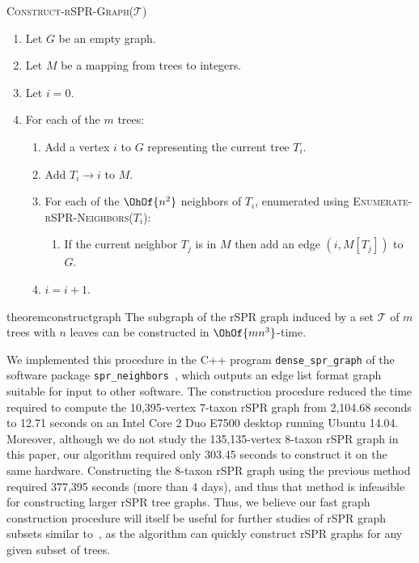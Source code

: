 \documentclass[11pt,onecolumn,conference]{IEEEtran}
\newtheorem{theorem}{Theorem}[section]
\begin{document}
\textsc{Construct-rSPR-Graph($\mathcal{T}$)}
\begin{enumerate}[label={\arabic*}.]
	\item Let $G$ be an empty graph.
	\item Let $M$ be a mapping from trees to integers.
	\item Let $i = 0$.
	\item For each of the $m$ trees: \vspace{-0.2em}
		\begin{enumerate}
			\item Add a vertex $i$ to $G$ representing the current tree $T_i$.
			\item Add $T_i \rightarrow i$ to $M$.
			\item For each of the $\OhOf{n^2}$ neighbors of $T_i$, enumerated using \textsc{Enumerate-rSPR-Neighbors($T_i$)}: \vspace{-1.4em}
				\begin{enumerate}
					\item If the current neighbor $T_j$ is in $M$ then add an edge $(i,M[T_j])$ to $G$.
				\end{enumerate}
		\item $i = i + 1$.
		\end{enumerate}
\end{enumerate}

\begin{restatable}{theorem}{constructgraph}
	\label{thm:construct_graph}
	The subgraph of the rSPR graph induced by a set $\mathcal{T}$ of $m$ trees with $n$ leaves can be constructed in $\OhOf{mn^3}$-time.
\end{restatable}

We implemented this procedure in the C++ program \texttt{dense\_spr\_graph} of the software package \texttt{spr\_neighbors}~\cite{spr_neighbors}, which outputs an edge list format graph suitable for input to other software.
The construction procedure reduced the time required to compute the 10,395-vertex 7-taxon rSPR graph from 2,104.68 seconds to 12.71 seconds on an Intel Core 2 Duo E7500 desktop running Ubuntu 14.04.
Moreover, although we do not study the 135,135-vertex 8-taxon rSPR graph in this paper, our algorithm required only 303.45 seconds to construct it on the same hardware.
Constructing the 8-taxon rSPR graph using the previous method required 377,395 seconds (more than 4 days), and thus that method is infeasible for constructing larger rSPR tree graphs.
Thus, we believe our fast graph construction procedure will itself be useful for further studies of rSPR graph subsets similar to~\cite{Whidden2015-yi}, as the algorithm can quickly construct rSPR graphs for any given subset of trees.
\end{document}
